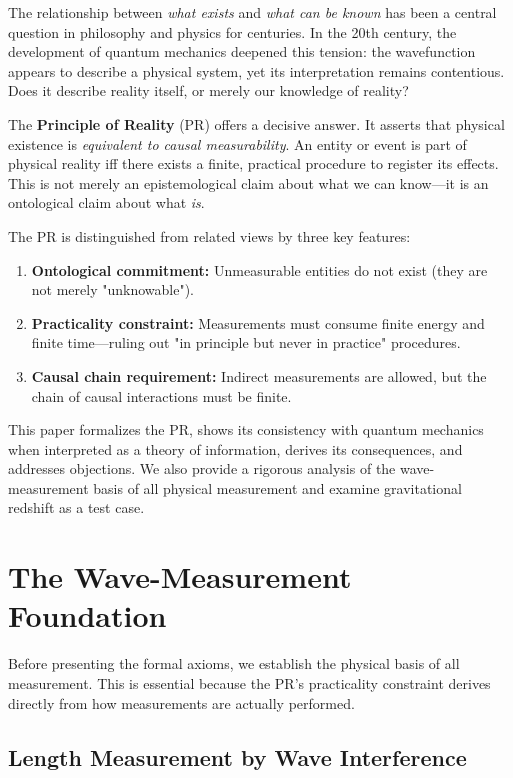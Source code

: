 \documentclass[aps,preprint,showpacs,showkeys]{revtex4}
\begin{document}
The relationship between \emph{what exists} and \emph{what can be known} has
been a central question in philosophy and physics for centuries. In the 20th
century, the development of quantum mechanics deepened this tension: the
wavefunction appears to describe a physical system, yet its interpretation
remains contentious. Does it describe reality itself, or merely our
knowledge of reality?

The \textbf{Principle of Reality} (PR) offers a decisive answer. It asserts
that physical existence is \emph{equivalent to causal measurability}. An
entity or event is part of physical reality iff there exists a finite,
practical procedure to register its effects. This is not merely an
epistemological claim about what we can know---it is an ontological claim
about what \emph{is}.

The PR is distinguished from related views by three key features:

\begin{enumerate}
\item \textbf{Ontological commitment:} Unmeasurable entities do not exist
(they are not merely "unknowable").

\item \textbf{Practicality constraint:} Measurements must consume finite
energy and finite time---ruling out "in principle but never in practice"
procedures.

\item \textbf{Causal chain requirement:} Indirect measurements are allowed,
but the chain of causal interactions must be finite.
\end{enumerate}

This paper formalizes the PR, shows its consistency with quantum mechanics
when interpreted as a theory of information, derives its consequences, and
addresses objections. We also provide a rigorous analysis of the
wave-measurement basis of all physical measurement and examine gravitational
redshift as a test case.

\section{The Wave-Measurement Foundation}

Before presenting the formal axioms, we establish the physical basis of all
measurement. This is essential because the PR's practicality constraint
derives directly from how measurements are actually performed.

\subsection{Length Measurement by Wave Interference}
\end{document}
